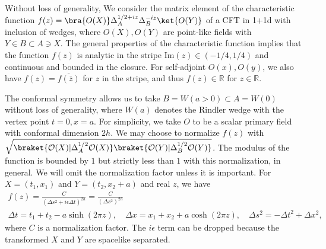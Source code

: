 \documentclass[a4paper,11pt]{article}
\theoremstyle{definition}
\newcommand{\mO}{\mathcal{O}}
\newcommand{\ep}{\epsilon}
\begin{document}
Without loss of generality, We consider the matrix element of the characteristic function $f(z)=\bra{O(X)}\Delta_A^{1/2+iz}\Delta_B^{-iz}\ket{O(Y)}$ of a CFT in 1+1d with inclusion of wedges, where $O(X),O(Y)$ are point-like fields with $Y\in B \subset A\ni X$. The general properties of the characteristic function implies that the function $f(z)$ is analytic in the stripe Im$(z)\in (-1/4,1/4)$ and continuous and bounded in the closure. For self-adjoint $O(x), O(y)$, we also have $f(z) = \overline{f(\overline{z})}$ for $z$ in the stripe, and thus $f(z)\in\mathbb{R}$ for $z\in\mathbb{R}$.

The conformal symmetry allows us to take $B = W(a>0) \subset A = W(0)$ without loss of generality, where $W(a)$ denotes the Rindler wedge with the vertex point $t=0,x=a$. For simplicity, we take $O$ to be a scalar primary field with conformal dimension $2h$. We may choose to normalize $f(z)$ with $\sqrt{\braket{\mO(X)|\Delta_A^{1/2}\mO(X)}\braket{\mO(Y)|\Delta_B^{1/2}\mO(Y)}}$. The modulus of the function is bounded by $1$ but strictly less than $1$ with this normalization, in general. We will omit the normalization factor unless it is important. For $X = (t_1,x_1)$ and $Y = (t_2,x_2+a)$ and real $z$, we have 
\begin{gather}
    f(z) =\frac{C}{(\Delta s^2+i\ep\Delta t)^{2h}} = \frac{C}{(\Delta s^2)^{2h}}\\ %
    \Delta t = t_1+t_2-a\sinh(2\pi z), \quad \Delta x =x_1+x_2 + a\cosh(2\pi z), \quad \Delta s^2 = -\Delta t^2 + \Delta x^2, %
\end{gather}
where $C$ is a normalization factor. The $i\ep$ term can be dropped because the transformed $X$ and $Y$ are spacelike separated.
\end{document}
